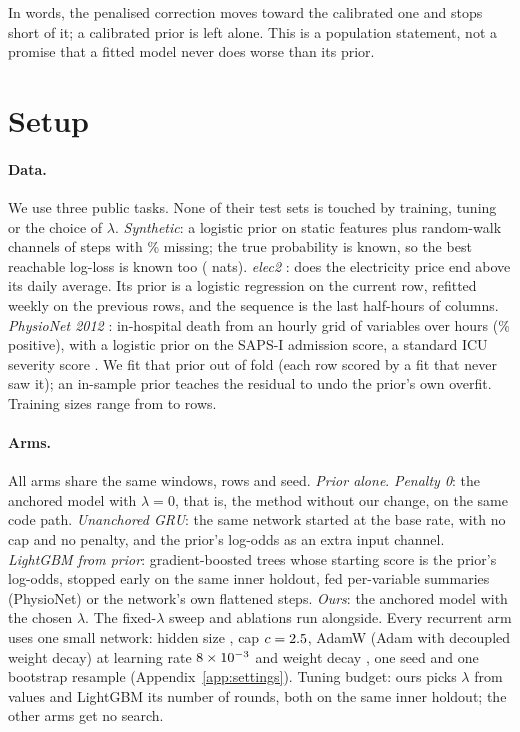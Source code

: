 \documentclass{article}
\begin{document}
In words, the penalised correction moves toward the calibrated one and stops short of it; a calibrated prior is
left alone. This is a population statement, not a promise that a fitted model never does worse than its prior.

\section{Setup}
\label{sec:setup}

\paragraph{Data.} We use three public tasks. None of their test sets is touched by training, tuning or the choice
of $\lambda$. \emph{Synthetic}: a logistic prior on static features plus \nSynChannels{} random-walk channels of
\nSynSteps{} steps with \nSynMissPct\% missing; the true probability is known, so the best reachable log-loss is
known too (\nSynBayesLL{} nats). \emph{elec2} \citep{harries1999elec2,gama2004drift}: does the electricity price
end above its daily average. Its prior is a logistic regression on the current row, refitted weekly on the previous
\nElecPriorRows{} rows, and the sequence is the last \nElecWindow{} half-hours of \nElecCols{} columns.
\emph{PhysioNet 2012} \citep{silva2012physionet,goldberger2000physiobank}: in-hospital death from an hourly grid of
\nPhysVars{} variables over \nPhysHours{} hours (\nPhysPosRate\% positive), with a logistic prior on the SAPS-I
admission score, a standard ICU severity score \citep{legall1984saps}. We fit that prior out of fold (each row scored by a fit that never saw it);
an in-sample prior teaches the residual to undo the prior's own overfit. Training sizes range from \nSizeCCL{} to
\nSizeMMMM{} rows.

\paragraph{Arms.} All arms share the same windows, rows and seed. \emph{Prior alone}. \emph{Penalty 0}: the anchored
model with $\lambda = 0$, that is, the method without our change, on the same code path. \emph{Unanchored GRU}: the same network started at the base rate, with no cap and no
penalty, and the prior's log-odds as an extra input channel. \emph{LightGBM from prior}: gradient-boosted trees
\citep{ke2017lightgbm} whose starting score is the prior's log-odds, stopped early on the same inner holdout, fed
per-variable summaries (PhysioNet) or the network's own flattened steps. \emph{Ours}: the anchored model with the
chosen $\lambda$. The fixed-$\lambda$ sweep and \nAblationCount{} ablations run alongside. Every recurrent arm uses
one small network: hidden size \nNetHidden, cap $c = 2.5$, AdamW (Adam with decoupled weight decay)
\citep{loshchilov2019adamw} at learning rate $8\times10^{-3}$ and weight decay \nNetWd, one seed and one bootstrap
resample (Appendix~\ref{app:settings}). Tuning budget: ours picks $\lambda$ from \nSweepCount{} values and LightGBM
its number of rounds, both on the same inner holdout; the other arms get no search.
\end{document}
